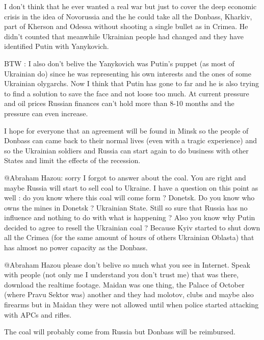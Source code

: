 \begin{itemize}
\begin{itemize}
I don't think that he ever wanted a real war but just to cover the deep
economic crisis in the idea of Novorussia and the he could take all the
Donbass, Kharkiv, part of Kherson and Odessa without shooting a single bullet
as in Crimea. He didn't counted that meanwhile Ukrainian people had changed and
they have identified Putin with Yanykovich.

BTW : I also don't belive the Yanykovich was Putin's puppet (as most of
Ukrainian do) since he was representing his own interests and the ones of some
Ukrainian olygarchs. Now I think that Putin has gone to far and he is also
trying to find a solution to save the face and not loose too much. At current
pressure and oil prices Russian finances can't hold more than 8-10 months and
the pressure can even increase. 

I hope for everyone that an agreement will be found in Minsk so the people of
Donbass can came back to their normal lives (even with a tragic experience) and
so the Ukrainian soldiers and Russia can start again to do business with other
States and limit the effects of the recession.


@Abraham Hazou: sorry I forgot to answer about the coal. You are right and
maybe Russia will start to sell coal to Ukraine. I have a question on this
point as well : do you know where this coal will come form ? Donetsk. Do you
know who owns the mines in Donetsk ? Ukrainian State. Still so sure that Russia
has no influence and nothing to do with what is happening ? Also you know why
Putin decided to agree to resell the Ukrainian coal ? Because Kyiv started to
shut down all the Crimea (for the same amount of hours of others Ukrainian
Oblasta) that has almost no power capacity as the Donbass.



@Abraham Hazou please don't belive so much what you see in Internet. Speak with
people (not only me I understand you don't trust me) that was there, download
the realtime footage. Maidan was one thing, the Palace of October (where Pravu
Sektor was) another and they had molotov, clubs and maybe also firearms but in
Maidan they were not allowed until when police started attacking with APCs and
rifles.


The coal will probably come from Russia but Donbass will be reimbursed.



\end{itemize} %

\end{itemize} %
